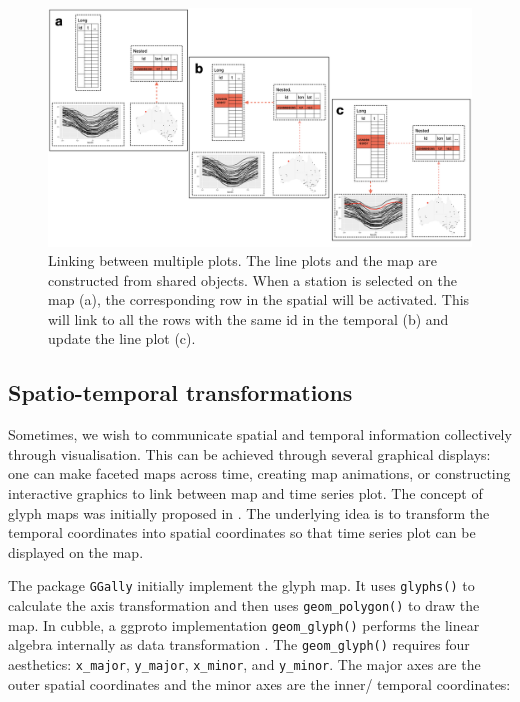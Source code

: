 \documentclass[
  shortnames]{jss}
\begin{document}
\begin{CodeChunk}
\begin{figure}

{\centering \includegraphics[width=1\linewidth,height=0.35\textheight]{figures/diagram-keynotes/diagram-keynotes.002} 

}

\caption{Linking between multiple plots. The line plots and the map are constructed from shared  objects. When a station is selected on the map (a), the corresponding row in the spatial  will be activated. This will link to all the rows with the same id in the temporal  (b) and update the line plot (c).}\label{fig:illu-interactive}
\end{figure}
\end{CodeChunk}

\hypertarget{st_transformation}{%
\subsection{Spatio-temporal transformations}\label{st_transformation}}

Sometimes, we wish to communicate spatial and temporal information collectively through visualisation. This can be achieved through several graphical displays: one can make faceted maps across time, creating map animations, or constructing interactive graphics to link between map and time series plot. The concept of glyph maps was initially proposed in \citet{Wickham2012-yr}. The underlying idea is to transform the temporal coordinates into spatial coordinates so that time series plot can be displayed on the map.

The package \texttt{GGally} initially implement the glyph map. It uses \texttt{glyphs()} to calculate the axis transformation and then uses \texttt{geom\_polygon()} to draw the map. In cubble, a ggproto implementation \texttt{geom\_glyph()} performs the linear algebra internally as data transformation . The \texttt{geom\_glyph()} requires four aesthetics: \texttt{x\_major}, \texttt{y\_major}, \texttt{x\_minor}, and \texttt{y\_minor}. The major axes are the outer spatial coordinates and the minor axes are the inner/ temporal coordinates:
\end{document}
